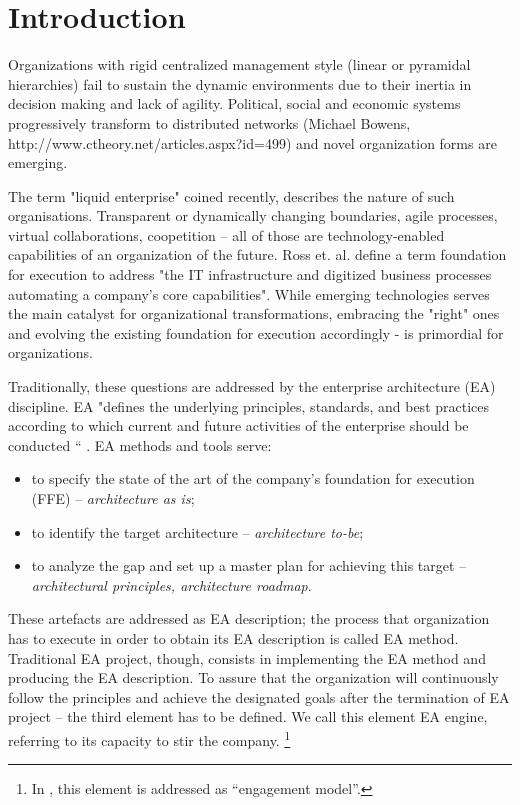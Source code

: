 \chapter{Introduction}
 Organizations with rigid centralized management style (linear or pyramidal hierarchies) fail to sustain the dynamic environments due to their inertia in decision making and lack of agility. Political, social and economic systems progressively transform to distributed networks (Michael Bowens, http://www.ctheory.net/articles.aspx?id=499) and novel organization forms are emerging. 

The term "liquid enterprise" coined recently, describes the nature of such organisations. Transparent or dynamically changing boundaries, agile processes\cite{agileproc}, virtual collaborations, coopetition \cite{coopetition} – all of those are technology-enabled capabilities of an organization of the future. 
Ross et. al. \cite{ross2006} define a term foundation for execution to address "the IT infrastructure and digitized business processes automating a company’s core capabilities". While emerging technologies serves the main catalyst for organizational transformations, embracing the "right" ones and evolving the existing foundation for execution accordingly - is primordial for organizations. 

Traditionally, these questions are addressed by the enterprise architecture (EA) discipline. EA "defines the underlying principles, standards, and best practices according to which current and future activities of the enterprise should be conducted “ \cite{schekkerman2003}. EA methods and tools serve:
\begin{itemize}
\item to specify the state of the art of the company’s foundation for execution (FFE) – \textit{architecture as is};
\item to identify the target architecture – \textit{architecture to-be};
\item to analyze the gap and set up a master plan for achieving this target – \textit{architectural principles, architecture roadmap}.
\end{itemize}
These artefacts are addressed as EA description; the process that organization has to execute in order to obtain its EA description is called EA method. Traditional EA project, though, consists in implementing the EA method and producing the EA description. To assure that the organization will continuously follow the principles and achieve the designated goals after the termination of EA project – the third element has to be defined. We call this element EA engine, referring to its capacity to stir the company. \footnote{In \cite{ross2006}, this element is addressed as “engagement model”.}

